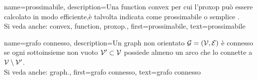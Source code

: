 {name={prossimabile},
	description={Una 
		\gls{function} \gls{convex} per cui l'\gls{proxop} può essere calcolato in modo efficiente,è  
		talvolta indicata come prossimabile o semplice \cite{Condat2013}.
					\\ 
		Si veda anche: \gls{convex}, \gls{function}, \gls{proxop}.},
	first={prossimabile},
	text={prossimabile}
}


{name={grafo connesso}, 
	description={Un 
		\gls{graph} non orientato $\mathcal{G}=\left( \mathcal{V},\mathcal{E} \right)$ è connesso se ogni 
		sottoinsieme non vuoto $\mathcal{V}' \subset \mathcal{V}$ possiede almeno un arco che lo connette a $\mathcal{V} \setminus \mathcal{V}'$.
					\\ 
		Si veda anche: \gls{graph}.}, 
	first={grafo connesso},
	text={grafo connesso}
}
	

